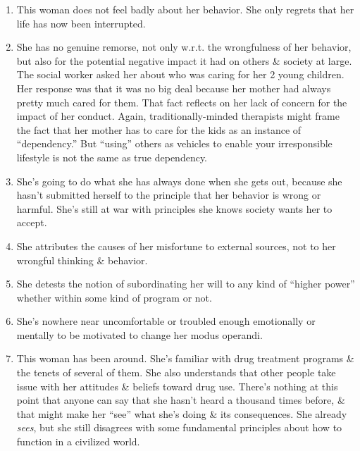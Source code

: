 \documentclass{article}
\numberwithin{equation}{section}
\begin{document}
\begin{enumerate}
	\item This woman does not feel badly about her behavior. She only regrets that her life has now been interrupted.
	\item She has no genuine remorse, not only w.r.t. the wrongfulness of her behavior, but also for the potential negative impact it had on others \& society at large. The social worker asked her about who was caring for her 2 young children. Her response was that it was no big deal because her  mother had always pretty much cared for them. That fact reflects on her lack of concern for the impact of her conduct. Again, traditionally-minded therapists might frame the fact that her mother has to care for the kids as an instance of ``dependency.'' But ``using'' others as vehicles to enable your irresponsible lifestyle is not the same as true dependency.
	\item She's going to do what she has always done when she gets out, because she hasn't submitted herself to the principle that her behavior is wrong or harmful. She's still at war with principles she knows society wants her to accept.
	\item She attributes the causes of her misfortune to external sources, not to her wrongful thinking \& behavior.
	\item She detests the notion of subordinating her will to any kind of ``higher power'' whether within some kind of program or not.
	\item She's nowhere near uncomfortable or troubled enough emotionally or mentally to be motivated to change her modus operandi.
	\item This woman has been around. She's familiar with drug treatment programs \& the tenets of several of them. She also understands that other people take issue with her attitudes \& beliefs toward drug use. There's nothing at this point that anyone can say that she hasn't heard a thousand times before, \& that might make her ``see'' what she's doing \& its consequences. She already \textit{sees}, but she still disagrees with some fundamental principles about how to function in a civilized world.
\end{enumerate}
\end{document}
